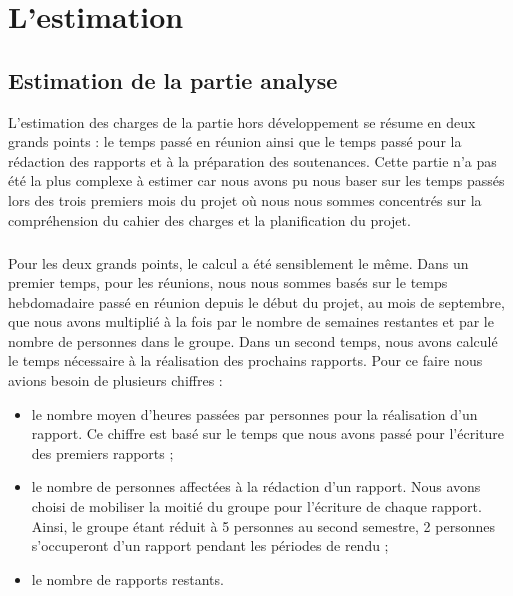 
\chapter{L'estimation}

\section{Estimation de la partie analyse}

L’estimation des charges de la partie hors développement se résume en deux grands points : le temps passé en réunion ainsi que le temps passé pour la rédaction des rapports et à la préparation des soutenances. Cette partie n’a pas été la plus complexe à estimer car nous avons pu nous baser sur les temps passés lors des trois premiers mois du projet où nous nous sommes concentrés sur la compréhension du cahier des charges et la planification du projet.

\paragraph{}

Pour les deux grands points, le calcul a été sensiblement le même. Dans un premier temps, pour les réunions, nous nous sommes basés sur le temps hebdomadaire passé en réunion depuis le début du projet, au mois de septembre, que nous avons multiplié à la fois par le nombre de semaines restantes et par le nombre de personnes dans le groupe. Dans un  second temps, nous avons calculé le temps nécessaire à la réalisation des prochains rapports. Pour ce faire nous avions besoin de plusieurs chiffres :

\begin{itemize}
\item le nombre moyen d’heures passées par personnes pour la réalisation d’un rapport. Ce chiffre est basé sur le temps que nous avons passé pour l’écriture des premiers rapports ;
\item le nombre de personnes affectées à la rédaction d’un rapport. Nous avons choisi de mobiliser la moitié du groupe pour l’écriture de chaque rapport. Ainsi, le groupe étant réduit à 5 personnes au second semestre, 2 personnes s’occuperont d’un rapport pendant les périodes de rendu ;
\item le nombre de rapports restants.
\end{itemize}

\paragraph{}

